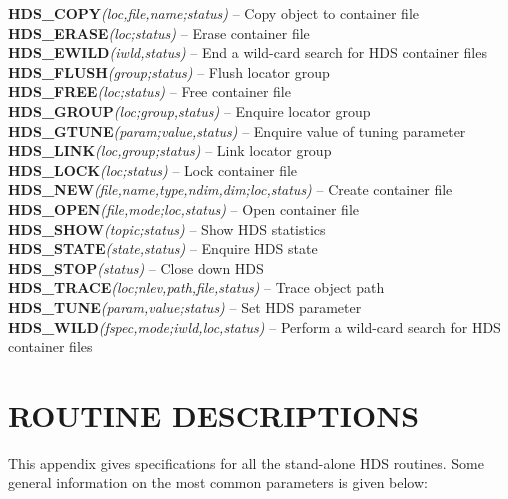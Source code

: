 \documentclass[11pt]{article}
\newcommand{\htmlref}[2]{#1}
\newcommand{\xlabel}[1]{}
\newcommand{\st}[1]{{\em{#1}}}
\begin{document}
\label{appendix:hdsroutines}
{\bf \htmlref{HDS\_COPY}{HDS_COPY}}\st{(loc,file,name;status)} -- Copy object to container file \\
{\bf \htmlref{HDS\_ERASE}{HDS_ERASE}}\st{(loc;status)} -- Erase container file \\
{\bf \htmlref{HDS\_EWILD}{HDS_EWILD}}\st{(iwld,status)} -- End a wild-card search for HDS container
files \\
{\bf \htmlref{HDS\_FLUSH}{HDS_FLUSH}}\st{(group;status)} -- Flush locator group \\
{\bf \htmlref{HDS\_FREE}{HDS_FREE}}\st{(loc;status)} -- Free container file \\
{\bf \htmlref{HDS\_GROUP}{HDS_GROUP}}\st{(loc;group,status)} -- Enquire locator group \\
{\bf \htmlref{HDS\_GTUNE}{HDS_GTUNE}}\st{(param;value,status)} -- Enquire value of tuning parameter \\
{\bf \htmlref{HDS\_LINK}{HDS_LINK}}\st{(loc,group;status)} -- Link locator group \\
{\bf \htmlref{HDS\_LOCK}{HDS_LOCK}}\st{(loc;status)} -- Lock container file \\
{\bf \htmlref{HDS\_NEW}{HDS_NEW}}\st{(file,name,type,ndim,dim;loc,status)} -- Create container file \\
{\bf \htmlref{HDS\_OPEN}{HDS_OPEN}}\st{(file,mode;loc,status)} -- Open container file \\
{\bf \htmlref{HDS\_SHOW}{HDS_SHOW}}\st{(topic;status)} -- Show HDS statistics \\
{\bf \htmlref{HDS\_STATE}{HDS_STATE}}\st{(state,status)} -- Enquire HDS state \\
{\bf \htmlref{HDS\_STOP}{HDS_STOP}}\st{(status)} -- Close down HDS \\
{\bf \htmlref{HDS\_TRACE}{HDS_TRACE}}\st{(loc;nlev,path,file,status)} -- Trace object path \\
{\bf \htmlref{HDS\_TUNE}{HDS_TUNE}}\st{(param,value;status)} -- Set HDS parameter \\
{\bf \htmlref{HDS\_WILD}{HDS_WILD}}\st{(fspec,mode;iwld,loc,status)} -- Perform a wild-card search
for HDS container files
\normalsize

\newpage
\section{\xlabel{routine_descriptions}\label{appendix:routines}ROUTINE DESCRIPTIONS}

This appendix gives specifications for all the stand-alone HDS
routines.  Some general information on the most common parameters is
given below:
\end{document}
